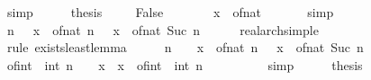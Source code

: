 \begin{isabellebody}
\ simp\isanewline
\ \ \isamarkupfalse%
\ \isamarkupfalse%
\ {\isacharquery}{\kern0pt}thesis\ \isacommand{{\isachardot}{\kern0pt}{\isachardot}{\kern0pt}}\isamarkupfalse%
\isanewline
{}\isamarkupfalse%
\isanewline
\ \ \isamarkupfalse%
\ False\isanewline
\ \ \isamarkupfalse%
\ \isamarkupfalse%
\ {\isachardoublequoteopen}{\isasymnot}\ {\isacharminus}{\kern0pt}\ x\ {\isasymle}\ of{\isacharunderscore}{\kern0pt}nat\ {}{\isachardoublequoteclose}\isanewline
\ \ \ \ \isamarkupfalse%
\ simp\isanewline
\ \ \isamarkupfalse%
\ \isamarkupfalse%
\ {\isachardoublequoteopen}{\isasymexists}n{\isachardot}{\kern0pt}\ {\isasymnot}\ {\isacharminus}{\kern0pt}\ x\ {\isasymle}\ of{\isacharunderscore}{\kern0pt}nat\ n\ {\isasymand}\ {\isacharminus}{\kern0pt}\ x\ {\isasymle}\ of{\isacharunderscore}{\kern0pt}nat\ {\isacharparenleft}{\kern0pt}Suc\ n{\isacharparenright}{\kern0pt}{\isachardoublequoteclose}\isanewline
\ \ \ \ \isamarkupfalse%
\ real{\isacharunderscore}{\kern0pt}arch{\isacharunderscore}{\kern0pt}simple\ \isamarkupfalse%
\ {\isacharparenleft}{\kern0pt}rule\ exists{\isacharunderscore}{\kern0pt}least{\isacharunderscore}{\kern0pt}lemma{\isacharparenright}{\kern0pt}\isanewline
\ \ \isamarkupfalse%
\ \isamarkupfalse%
\ n\ \ {\isachardoublequoteopen}{\isasymnot}\ {\isacharminus}{\kern0pt}\ x\ {\isasymle}\ of{\isacharunderscore}{\kern0pt}nat\ n\ {\isasymand}\ {\isacharminus}{\kern0pt}\ x\ {\isasymle}\ of{\isacharunderscore}{\kern0pt}nat\ {\isacharparenleft}{\kern0pt}Suc\ n{\isacharparenright}{\kern0pt}{\isachardoublequoteclose}\ \isacommand{{\isachardot}{\kern0pt}{\isachardot}{\kern0pt}}\isamarkupfalse%
\isanewline
\ \ \isamarkupfalse%
\ \isamarkupfalse%
\ {\isachardoublequoteopen}of{\isacharunderscore}{\kern0pt}int\ {\isacharparenleft}{\kern0pt}{\isacharminus}{\kern0pt}\ int\ n\ {\isacharminus}{\kern0pt}\ {}{\isacharparenright}{\kern0pt}\ {\isasymle}\ x\ {\isasymand}\ x\ {\isacharless}{\kern0pt}\ of{\isacharunderscore}{\kern0pt}int\ {\isacharparenleft}{\kern0pt}{\isacharminus}{\kern0pt}\ int\ n\ {\isacharminus}{\kern0pt}\ {}\ {\isacharplus}{\kern0pt}\ {}{\isacharparenright}{\kern0pt}{\isachardoublequoteclose}\isanewline
\ \ \ \ \isamarkupfalse%
\ simp\isanewline
\ \ \isamarkupfalse%
\ \isamarkupfalse%
\ {\isacharquery}{\kern0pt}thesis\ \isacommand{{\isachardot}{\kern0pt}{\isachardot}{\kern0pt}}\isamarkupfalse%

\end{isabellebody}
